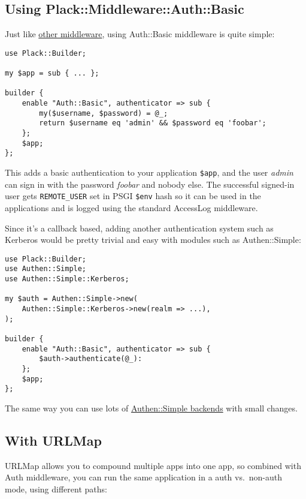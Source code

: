 \subsection{Using
Plack::Middleware::Auth::Basic}\label{using-plackmiddlewareauthbasic}

Just like
\href{http://advent.plackperl.org/2009/12/day-10-using-plack-middleware.html}{other
middleware}, using Auth::Basic middleware is quite simple:

\begin{lstlisting}
use Plack::Builder;

my $app = sub { ... };

builder {
    enable "Auth::Basic", authenticator => sub {
        my($username, $password) = @_;
        return $username eq 'admin' && $password eq 'foobar';
    };
    $app;
};
\end{lstlisting}

This adds a basic authentication to your application \lstinline!$app!,
and the user \emph{admin} can sign in with the password \emph{foobar}
and nobody else. The successful signed-in user gets
\lstinline!REMOTE_USER! set in PSGI \lstinline!$env! hash so it can be
used in the applications and is logged using the standard AccessLog
middleware.

Since it's a callback based, adding another authentication system such
as Kerberos would be pretty trivial and easy with modules such as
Authen::Simple:

\begin{lstlisting}
use Plack::Builder;
use Authen::Simple;
use Authen::Simple::Kerberos;

my $auth = Authen::Simple->new(
    Authen::Simple::Kerberos->new(realm => ...),
);

builder {
    enable "Auth::Basic", authenticator => sub {
        $auth->authenticate(@_):
    };
    $app;
};
\end{lstlisting}

The same way you can use lots of
\href{http://search.cpan.org/search?query=authen+simple\&mode=all}{Authen::Simple
backends} with small changes.

\subsection{With URLMap}\label{with-urlmap}

URLMap allows you to compound multiple apps into one app, so combined
with Auth middleware, you can run the same application in a auth
vs.~non-auth mode, using different paths:

